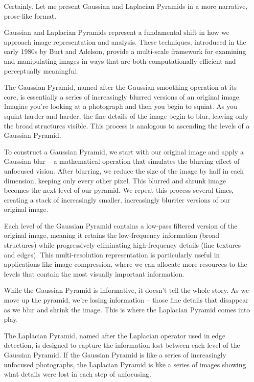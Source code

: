 Certainly. Let me present Gaussian and Laplacian Pyramids in a more narrative, prose-like format.

Gaussian and Laplacian Pyramids represent a fundamental shift in how we approach image representation and analysis. These techniques, introduced in the early 1980s by Burt and Adelson, provide a multi-scale framework for examining and manipulating images in ways that are both computationally efficient and perceptually meaningful.

The Gaussian Pyramid, named after the Gaussian smoothing operation at its core, is essentially a series of increasingly blurred versions of an original image. Imagine you're looking at a photograph and then you begin to squint. As you squint harder and harder, the fine details of the image begin to blur, leaving only the broad structures visible. This process is analogous to ascending the levels of a Gaussian Pyramid.

To construct a Gaussian Pyramid, we start with our original image and apply a Gaussian blur – a mathematical operation that simulates the blurring effect of unfocused vision. After blurring, we reduce the size of the image by half in each dimension, keeping only every other pixel. This blurred and shrunk image becomes the next level of our pyramid. We repeat this process several times, creating a stack of increasingly smaller, increasingly blurrier versions of our original image.

Each level of the Gaussian Pyramid contains a low-pass filtered version of the original image, meaning it retains the low-frequency information (broad structures) while progressively eliminating high-frequency details (fine textures and edges). This multi-resolution representation is particularly useful in applications like image compression, where we can allocate more resources to the levels that contain the most visually important information.

While the Gaussian Pyramid is informative, it doesn't tell the whole story. As we move up the pyramid, we're losing information – those fine details that disappear as we blur and shrink the image. This is where the Laplacian Pyramid comes into play.

The Laplacian Pyramid, named after the Laplacian operator used in edge detection, is designed to capture the information lost between each level of the Gaussian Pyramid. If the Gaussian Pyramid is like a series of increasingly unfocused photographs, the Laplacian Pyramid is like a series of images showing what details were lost in each step of unfocusing.

